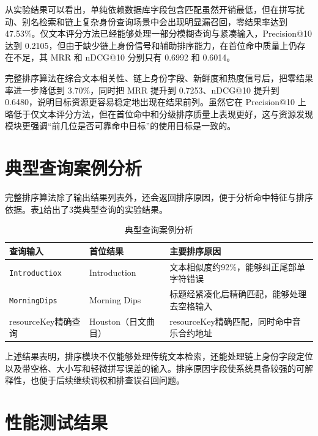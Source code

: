 从实验结果可以看出，单纯依赖数据库字段包含匹配虽然开销最低，但在拼写扰动、别名检索和链上复杂身份查询场景中会出现明显漏召回，零结果率达到 47.53\%。仅文本评分方法已经能够处理一部分模糊查询与紧凑输入，Precision@10 达到 0.2105，但由于缺少链上身份信号和辅助排序能力，在首位命中质量上仍存在不足，其 MRR 和 nDCG@10 分别只有 0.6992 和 0.6014。

完整排序算法在综合文本相关性、链上身份字段、新鲜度和热度信号后，把零结果率进一步降低到 3.70\%，同时把 MRR 提升到 0.7253、nDCG@10 提升到 0.6480，说明目标资源更容易稳定地出现在结果前列。虽然它在 Precision@10 上略低于仅文本评分方法，但在首位命中和分级排序质量上表现更好，这与资源发现模块更强调“前几位是否可靠命中目标”的使用目标是一致的。


\section{典型查询案例分析}

完整排序算法除了输出结果列表外，还会返回排序原因，便于分析命中特征与排序依据。表\ref{tab:ranking_case_analysis}给出了3类典型查询的实验结果。

\begin{table}[htbp]
    \linespread{1.45}
    \songti
    \centering
    \caption{典型查询案例分析}\label{tab:ranking_case_analysis}
    \begin{tabular}{|p{3.6cm}|p{3.6cm}|p{5.2cm}|}
        \hline
        查询输入                               & 首位结果                      & 主要排序原因                          \\ \hline
        \texttt{Introductiox}              & Introduction            & 文本相似度约92\%，能够纠正尾部单字符错误               \\ \hline
        \texttt{MorningDips}               & Morning Dips            & 标题经紧凑化后精确匹配，能够处理去空格输入             \\ \hline
        resourceKey精确查询                    & Houston（日文曲目）          & resourceKey精确匹配，同时命中音乐合约地址             \\ \hline
    \end{tabular}
\end{table}

上述结果表明，排序模块不仅能够处理传统文本检索，还能处理链上身份字段定位以及带空格、大小写和轻微拼写误差的输入。排序原因字段使系统具备较强的可解释性，也便于后续继续调权和排查误召回问题。


\section{性能测试结果}


